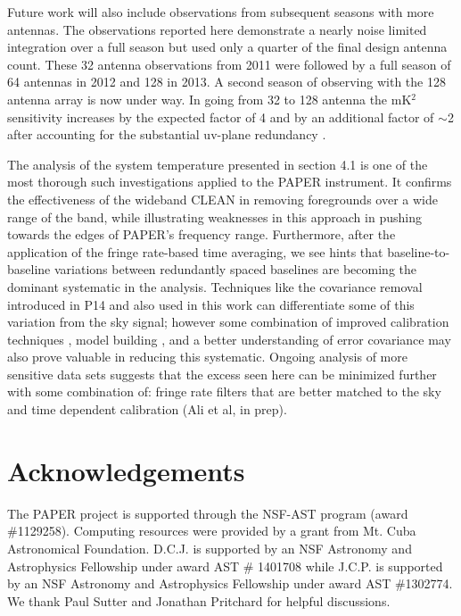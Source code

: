 \documentclass[preprint2]{aastex}
\begin{document}
Future work will also include observations from subsequent seasons with more antennas.  The observations reported here demonstrate a nearly noise limited integration over a full season but used only a quarter of the final design antenna count. These  32 antenna observations from 2011 were followed by a full season of 64 antennas in 2012 and 128 in 2013.  A second season of observing with the 128 antenna array is now under way. In going from  32 to 128 antenna the mK$^2$ sensitivity increases by the expected factor of 4 and by an additional factor of $\sim$2 after accounting for the substantial uv-plane redundancy \citep{Parsons:2012p9028}. 

The analysis of the system temperature presented in section 4.1 is one of the most thorough such investigations applied to the PAPER instrument.  It confirms the effectiveness of the wideband CLEAN in removing foregrounds over a wide range of the band, while illustrating weaknesses in this approach in pushing towards the edges of PAPER's frequency range.  Furthermore, after the application of the fringe rate-based time averaging, we see hints that baseline-to-baseline variations between redundantly spaced baselines are becoming the dominant systematic in the analysis.  Techniques like the covariance removal introduced in P14 and also used in this work can differentiate some of this variation from the sky signal; however some combination of improved calibration techniques \citep{Zheng:2014p10467}, model building \citep{Sullivan:2012p9457}, and a better understanding of error covariance  \citep{Liu:2011p8763} may also prove valuable in reducing this systematic. Ongoing analysis of more sensitive data sets suggests that the excess seen here can be minimized further with some combination of: fringe rate filters that are better matched to the sky and time dependent calibration (Ali et al, in prep).



\section{Acknowledgements}
The PAPER project is supported through the NSF-AST program (award \#1129258). Computing resources were provided by a grant from Mt. Cuba Astronomical Foundation.  D.C.J. is supported by an NSF Astronomy and Astrophysics Fellowship under award AST \# 1401708 while J.C.P. is supported by an NSF Astronomy and Astrophysics Fellowship under award AST \#1302774.   We thank Paul Sutter and Jonathan Pritchard for helpful discussions.




\end{document}
